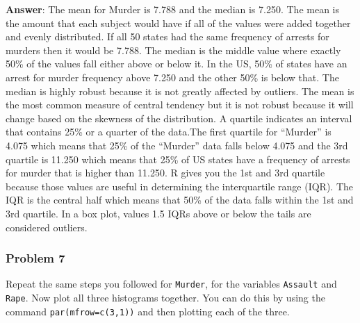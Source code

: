 \documentclass[
]{article}
\begin{document}
\textbf{Answer}: The mean for Murder is 7.788 and the median is 7.250.
The mean is the amount that each subject would have if all of the values
were added together and evenly distributed. If all 50 states had the
same frequency of arrests for murders then it would be 7.788. The median
is the middle value where exactly 50\% of the values fall either above
or below it. In the US, 50\% of states have an arrest for murder
frequency above 7.250 and the other 50\% is below that. The median is
highly robust because it is not greatly affected by outliers. The mean
is the most common measure of central tendency but it is not robust
because it will change based on the skewness of the distribution. A
quartile indicates an interval that contains 25\% or a quarter of the
data.The first quartile for ``Murder'' is 4.075 which means that 25\% of
the ``Murder'' data falls below 4.075 and the 3rd quartile is 11.250
which means that 25\% of US states have a frequency of arrests for
murder that is higher than 11.250. R gives you the 1st and 3rd quartile
because those values are useful in determining the interquartile range
(IQR). The IQR is the central half which means that 50\% of the data
falls within the 1st and 3rd quartile. In a box plot, values 1.5 IQRs
above or below the tails are considered outliers.

\hypertarget{problem-7}{%
\subsubsection{Problem 7}\label{problem-7}}

Repeat the same steps you followed for \texttt{Murder}, for the
variables \texttt{Assault} and \texttt{Rape}. Now plot all three
histograms together. You can do this by using the command
\texttt{par(mfrow=c(3,1))} and then plotting each of the three.
\end{document}
